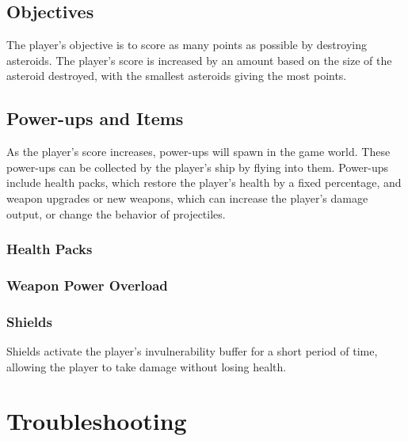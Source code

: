 \documentclass[12pt, a4paper]{article}
\begin{document}
\subsection{Objectives}

The player's objective is to score as many points as possible by destroying asteroids. The player's score is increased by an amount based on the size of the asteroid destroyed, with the smallest asteroids giving the most points.

\subsection{Power-ups and Items}

As the player's score increases, power-ups will spawn in the game world. These power-ups can be collected by the player's ship by flying into them. Power-ups include health packs, which restore the player's health by a fixed percentage, and weapon upgrades or new weapons, which can increase the player's damage output, or change the behavior of projectiles.

\subsubsection{Health Packs}

\subsubsection{Weapon Power Overload}

\subsubsection{Shields}

Shields activate the player's invulnerability buffer for a short period of time, allowing the player to take damage without losing health.

\section{Troubleshooting}

\printbibliography
\end{document}
